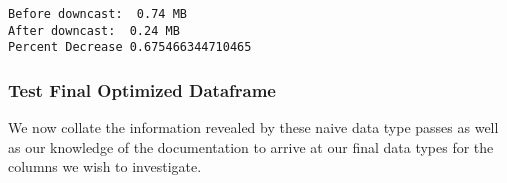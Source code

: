\documentclass[11pt]{article}
\begin{document}
    \begin{Verbatim}[commandchars=\\\{\}]
Before downcast:  0.74 MB
After downcast:  0.24 MB
Percent Decrease 0.675466344710465

    \end{Verbatim}

    \subsubsection{Test Final Optimized
Dataframe}\label{test-final-optimized-dataframe}

    We now collate the information revealed by these naive data type passes
as well as our knowledge of the documentation to arrive at our final
data types for the columns we wish to investigate.
\end{document}
